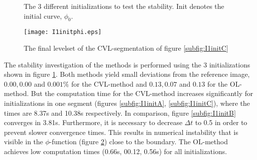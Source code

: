\begin{figure}[h]
  \centering
  \caption{The 3 different initializations to test the stability. Init denotes the initial curve, $\phi_0$.}\label{I1init}
\end{figure}

\begin{figure}[h]
  \centering
  \texttt{[image: I1initphi.eps]}
  \caption{The final levelset of the CVL-segmentation of figure \ref{subfig:I1initC}}\label{I1initphi}
\end{figure}


The stability investigation of the methods is performed using the 3 initializations shown in figure \ref{I1init}. Both methods yield small deviations from the reference image, $0.00, 0.00$ and $0.001\%$ for the CVL-method and $0.13, 0.07$ and $0.13$ for the OL-method. But the computation time for the CVL-method increases significantly for initializations in one segment (figures \ref{subfig:I1initA}, \ref{subfig:I1initC}), where the times are 8.37s and 10.38s respectively. In comparison, figure \ref{subfig:I1initB} converges in 3.81s. Furthermore, it is necessary to decrease $\Delta t$ to 0.5 in order to prevent slower convergence times. This results in numerical instability that is visible in the $\phi$-function (figure \ref{I1initphi}) close to the boundary. The OL-method achieves low computation times (0.66s, 00.12, 0.56s) for all initializations.


